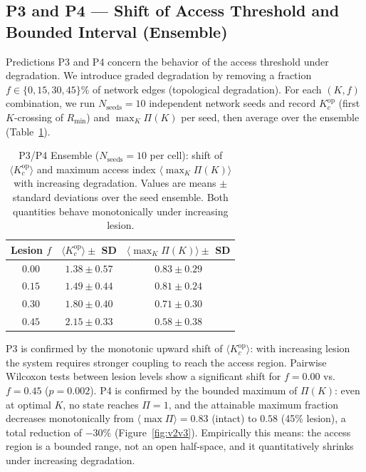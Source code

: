 \documentclass[11pt,a4paper]{article}
\theoremstyle{plain}
\theoremstyle{definition}
\theoremstyle{remark}
\begin{document}
\subsection{P3 and P4 --- Shift of Access Threshold and Bounded Interval (Ensemble)}

Predictions P3 and P4 concern the behavior of the access threshold under degradation. We introduce graded degradation by removing a fraction $f \in \{0, 15, 30, 45\}\%$ of network edges (topological degradation). For each $(K, f)$ combination, we run $N_{\mathrm{seeds}} = 10$ independent network seeds and record $K_c^{\mathrm{op}}$ (first $K$-crossing of $R_{\min}$) and $\max_K \Pi(K)$ per seed, then average over the ensemble (Table~\ref{tab:v2}).

\begin{table}[t]
\centering
\caption{P3/P4 Ensemble ($N_{\mathrm{seeds}} = 10$ per cell): shift of $\langle K_c^{\mathrm{op}}\rangle$ and maximum access index $\langle\max_K \Pi(K)\rangle$ with increasing degradation. Values are means $\pm$ standard deviations over the seed ensemble. Both quantities behave monotonically under increasing lesion.}
\label{tab:v2}
\begin{tabular}{ccc}
\hline
Lesion $f$ & $\langle K_c^{\mathrm{op}}\rangle \pm $ SD & $\langle\max_K \Pi(K)\rangle \pm $ SD \\
\hline
$0.00$ & $1.38 \pm 0.57$ & $0.83 \pm 0.29$ \\
$0.15$ & $1.49 \pm 0.44$ & $0.81 \pm 0.24$ \\
$0.30$ & $1.80 \pm 0.40$ & $0.71 \pm 0.30$ \\
$0.45$ & $2.15 \pm 0.33$ & $0.58 \pm 0.38$ \\
\hline
\end{tabular}
\end{table}

P3 is confirmed by the monotonic upward shift of $\langle K_c^{\mathrm{op}}\rangle$: with increasing lesion the system requires stronger coupling to reach the access region. Pairwise Wilcoxon tests between lesion levels show a significant shift for $f=0.00$ vs.\ $f=0.45$ ($p = 0.002$). P4 is confirmed by the bounded maximum of $\Pi(K)$: even at optimal $K$, no state reaches $\Pi = 1$, and the attainable maximum fraction decreases monotonically from $\langle\max\Pi\rangle = 0.83$ (intact) to $0.58$ (45\% lesion), a total reduction of $-30\%$ (Figure~\ref{fig:v2v3}). Empirically this means: the access region is a bounded range, not an open half-space, and it quantitatively shrinks under increasing degradation.
\end{document}
